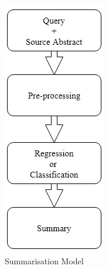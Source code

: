 \documentclass[final]{beamer}
\newlength{\sepwid}
\newlength{\onecolwid}
\newlength{\twocolwid}
\begin{document}
\begin{frame}[t]
\begin{columns}[t]
\begin{column}{\twocolwid}
\begin{columns}
\column{\onecolwid}
\begin{figure}
\includegraphics[width=0.6\linewidth]{model.png}
\caption{Summarisation Model\label{fig:model}}
\end{figure}

\end{columns}


\end{column} %

\begin{column}{\sepwid}\end{column} %

\begin{column}{\twocolwid} %


\end{column}
\end{columns}
\end{frame}
\end{document}
